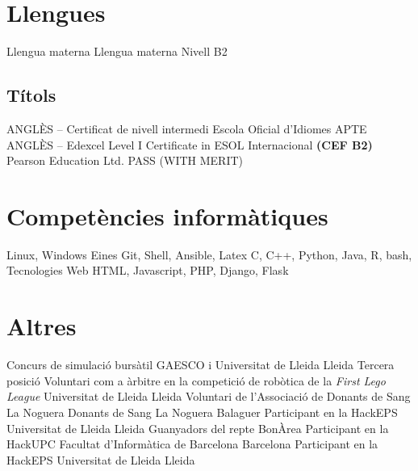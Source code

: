 \documentclass[a4paper,12pt,final]{moderncv}
\begin{document}
\section{Llengues}
	{Llengua materna}
	{}
	{Llengua materna}
	{}
	{Nivell B2}
	{}

\subsection{Títols}
	{ANGLÈS -- Certificat de nivell intermedi}
	{Escola Oficial d'Idiomes}
	{}
	{APTE}
	{}
	{ANGLÈS -- Edexcel Level I Certificate in ESOL Internacional
		\textbf{(CEF B2)}}
	{Pearson Education Ltd.}
	{}
	{PASS (WITH MERIT)}
	{}


\section{Competències informàtiques}
		{Linux, Windows}
	{Eines}
		{Git, Shell, Ansible, Latex}
		{C, C++, Python, Java, R, bash,}
	{Tecnologies Web}
		{HTML, Javascript, PHP, Django, Flask}

\section{Altres}
	{Concurs de simulació bursàtil}
	{GAESCO i Universitat de Lleida}
	{Lleida}
	{Tercera posició}
	{}
	{Voluntari com a àrbitre en la competició de robòtica de la
		\textit{First Lego League}}
	{Universitat de Lleida}
	{Lleida}
	{}
	{}
	{Voluntari de l'Associació de Donants de Sang La Noguera}
	{Donants de Sang La Noguera}
	{Balaguer}
	{}
	{}
	{Participant en la HackEPS}
	{Universitat de Lleida}
	{Lleida}
	{Guanyadors del repte BonÀrea}
	{}
	{Participant en la HackUPC}
	{Facultat d'Informàtica de Barcelona}
	{Barcelona}
	{}
	{}
	{Participant en la HackEPS}
	{Universitat de Lleida}
	{Lleida}
	{}
	{}
\end{document}
